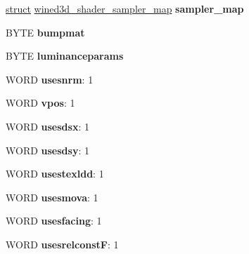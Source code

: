 \begin{DoxyCompactItemize}
\hyperlink{interfacestruct}{struct} \hyperlink{structwined3d__shader__sampler__map}{wined3d\+\_\+shader\+\_\+sampler\+\_\+map} {\bfseries sampler\+\_\+map}
\item 
\mbox{\label{structwined3d__shader__reg__maps_ad91b3cd4312f083239dd44311555456a}} 
B\+Y\+TE {\bfseries bumpmat}
\item 
\mbox{\label{structwined3d__shader__reg__maps_a61fbbc4424bf00a92b928f9e4e50db41}} 
B\+Y\+TE {\bfseries luminanceparams}
\item 
\mbox{\label{structwined3d__shader__reg__maps_a20a4d23c9564ca6a98fb68990c024cab}} 
W\+O\+RD {\bfseries usesnrm}\+: 1
\item 
\mbox{\label{structwined3d__shader__reg__maps_adf00c0f73ca70740d688fe84fcc06c1c}} 
W\+O\+RD {\bfseries vpos}\+: 1
\item 
\mbox{\label{structwined3d__shader__reg__maps_a1143c8a78207aa28a9b16e6a1db074e1}} 
W\+O\+RD {\bfseries usesdsx}\+: 1
\item 
\mbox{\label{structwined3d__shader__reg__maps_a40d89ff8284e7cfba1975b3f12120f98}} 
W\+O\+RD {\bfseries usesdsy}\+: 1
\item 
\mbox{\label{structwined3d__shader__reg__maps_ab0b88265401b2967bd4a1aa6b6d6d2bd}} 
W\+O\+RD {\bfseries usestexldd}\+: 1
\item 
\mbox{\label{structwined3d__shader__reg__maps_ab72e987d45c3e0b7c9f9813742fdb730}} 
W\+O\+RD {\bfseries usesmova}\+: 1
\item 
\mbox{\label{structwined3d__shader__reg__maps_a39c627c000dd4fa59df9cc153670a145}} 
W\+O\+RD {\bfseries usesfacing}\+: 1
\item 
\mbox{\label{structwined3d__shader__reg__maps_a49296cb068546e10ebe60912e4ed5058}} 
W\+O\+RD {\bfseries usesrelconstF}\+: 1

\end{DoxyCompactItemize}

